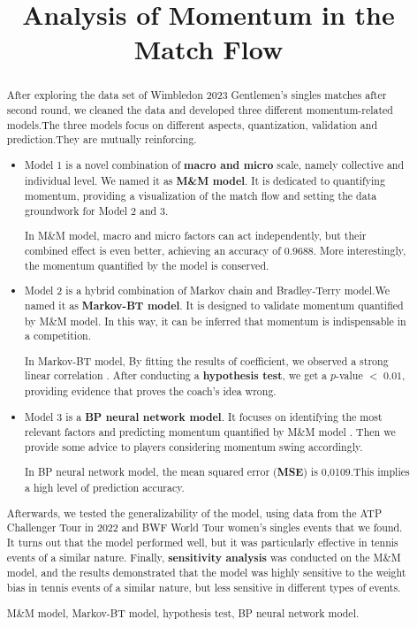 \documentclass{mcmthesis}
\title{Analysis of Momentum in the Match Flow}
\begin{document}
\begin{abstract}
\par After exploring the data set of Wimbledon 2023 Gentlemen’s singles matches after second round, we cleaned the data and developed three different momentum-related models.The three models focus on different aspects, quantization, validation and prediction.They are mutually reinforcing.
\begin{itemize}
	\item Model 1 is a novel combination of \textbf{macro and micro} scale, namely collective and individual level. We named it as \textbf{M\&M model}. It is dedicated to quantifying momentum, providing a visualization of the match flow and setting the data groundwork for Model 2 and 3. 
	
	In M\&M model, macro and micro factors can act independently, but their combined effect is even better, achieving an accuracy of $0.9688$. More interestingly, the momentum quantified by the model is conserved.
	\item Model 2 is a hybrid combination of Markov chain and Bradley-Terry model.We named it as \textbf{Markov-BT model}. It is designed to validate momentum quantified by M\&M model. In this way, it can be inferred that momentum is indispensable in a competition.
	
	In Markov-BT model, By fitting the results of coefficient, we observed a strong linear correlation . After conducting a \textbf{hypothesis test}, we get a $p$-value $< \;0.01$, providing evidence that proves the coach's idea wrong.
	\item Model 3 is a \textbf{BP neural network model}. It focuses on identifying the most relevant factors and predicting momentum quantified by M\&M model . Then we provide some advice to players considering momentum swing accordingly.
	
	In BP neural network model, the mean squared error (\textbf{MSE}) is 0,0109.This implies a high level of prediction accuracy.
\end{itemize}

Afterwards, we tested the generalizability of the model, using data from the ATP Challenger Tour in 2022 and BWF World Tour women's singles events that we found. It turns out that the model performed well, but it was particularly effective in tennis events of a similar nature. Finally, \textbf{sensitivity analysis} was conducted on the M\&M model, and the results demonstrated that the model was highly sensitive to the weight bias in tennis events of a similar nature, but less sensitive in different types of events.
\begin{keywords}
M\&M model, Markov-BT model, hypothesis test, BP neural network model.
\end{keywords}
\end{abstract}
\end{document}
